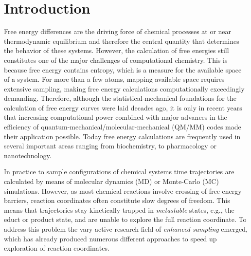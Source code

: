 \chapter{Introduction}
\label{cha:introduction}
Free energy differences are the driving force of chemical processes at or near thermodynamic equilibrium and therefore the central quantity that determines the behavior of these systems.\autocite{chipot2007free}
However, the calculation of free energies still constitutes one of the major challenges of computational chemistry.\autocite{kastner2011umbrella}
This is because free energy contains entropy, which is a measure for the available space of a system.
For more than a few atoms, mapping available space requires extensive sampling, making free energy calculations computationally exceedingly demanding.\autocite{kollman1993free}
Therefore, although the statistical-mechanical foundations for the calculation of free energy curves were laid decades ago,\autocite{chipot2007free} it is only in recent years that increasing computational power combined with major advances in the efficiency of quantum-mechanical/molecular-mechanical (QM/MM) codes\autocite{ochsenfeld2007linear,shao2015advances,acun2018scalable} made their application possible.
Today free energy calculations are frequently used in several important areas ranging from biochemistry\autocite{gumbart2013standard,fu2017new,capelli2019chasing}, to pharmacology\autocite{yu2017computer,sinko2013accounting} or
nanotechnology.\autocite{fu2017lubricating,chen2019tumbling}

In practice to sample configurations of chemical systems time trajectories are calculated by means of molecular dynamics (MD) or Monte-Carlo (MC) simulations.\autocite{ponder2003force,burke2012perspective}
However, as most chemical reactions involve crossing of free energy barriers, reaction coordinates often constitute slow degrees of freedom.
This means that trajectories stay kinetically trapped in \textit{metastable} states, e.g., the educt or product state, and are unable to explore the full reaction coordinate.\autocite{chipot2007free}
To address this problem the vary active research field of \textit{enhanced sampling} emerged, which has already produced numerous different approaches to speed up exploration of reaction coordinates.
\autocite{jiang2010free, sugita1999replica,den2000thermodynamic, ciccotti2005blue, barducci2008well}

